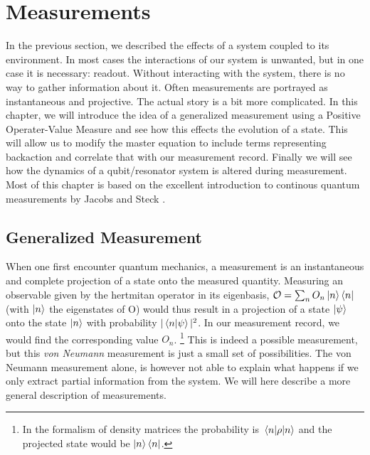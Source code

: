 \chapter{Measurements}\label{chap:measurements}
In the previous section, we described the effects of a system coupled to its environment. In most cases the interactions of our system is unwanted, but in one case it is necessary: readout. Without interacting with the system, there is no way to gather information about it. Often measurements are portrayed as instantaneous and projective. The actual story is a bit more complicated. In this chapter, we will introduce the idea of a generalized measurement using a Positive Operater-Value Measure and see how this effects the evolution of a state. This will allow us to modify the master equation to include terms representing backaction and correlate that with our measurement record. Finally we will see how the dynamics of a qubit/resonator system is altered during measurement. Most of this chapter is based on the excellent introduction to continous quantum measurements by Jacobs and Steck \cite{jacobs_straightforward_2006}.

\section{Generalized Measurement}
When one first encounter quantum mechanics, a measurement is an instantaneous and complete projection of a state onto the measured quantity. Measuring an observable given by the hertmitan operator in its eigenbasis, $\mathcal{O} = \sum_n O_n \ket{n}\bra{n}$ (with $\ket{n}$ the eigenstates of O) would thus result in a projection of a state $\ket{\psi}$ onto the state $\ket{n}$ with probability $|\braket{n}{\psi}|^2$. In our measurement record, we would find the corresponding value $O_n$. \footnote{In the formalism of density matrices the probability is $\mel{n}{\rho}{n}$ and the projected state would be $\ket{n}\bra{n}$.} This is indeed a possible measurement, but this \textit{von Neumann} measurement is just a small set of possibilities. The von Neumann measurement alone, is however not able to explain what happens if we only extract partial information from the system. We will here describe a more general description of measurements. 

